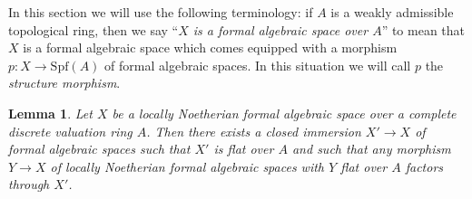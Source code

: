 \documentclass{stacks-project}
\theoremstyle{plain}
\newtheorem{lemma}[subsection]{Lemma}
\theoremstyle{definition}
\theoremstyle{remark}
\numberwithin{equation}{subsection}
\begin{document}
\noindent
In this section we will use the following terminology:
if $A$ is a weakly admissible topological ring, then we
say ``{\it $X$ is a formal algebraic space over $A$}'' to mean that $X$
is a formal algebraic space which comes equipped with
a morphism $p : X \to \text{Spf}(A)$ of formal algebraic spaces.
In this situation we will call $p$ the {\it structure morphism}.

\begin{lemma}
\label{lemma-flat-locus}
Let $X$ be a locally Noetherian formal algebraic space over
a complete discrete valuation ring $A$.
Then there exists a closed immersion $X' \to X$
of formal algebraic spaces such that $X'$ is flat over $A$
and such that any morphism $Y \to X$ of locally Noetherian formal algebraic
spaces with $Y$ flat over $A$ factors through $X'$.
\end{lemma}
\end{document}
